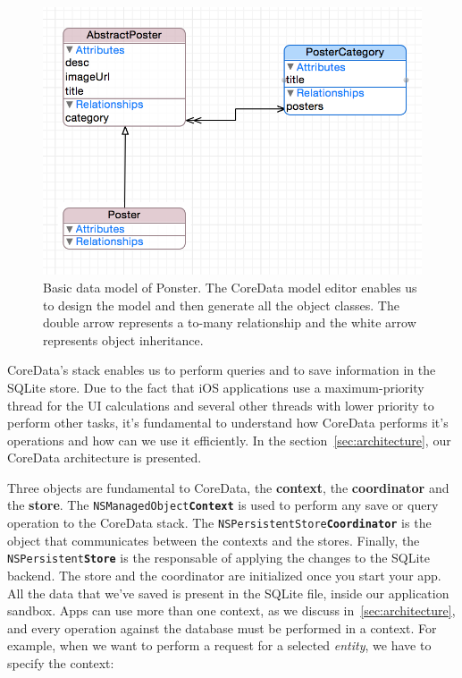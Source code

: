 \begin{figure}
\centering
\includegraphics[scale=0.65]{img/coredata.png}
\caption{\label{fig:coredata}Basic data model of Ponster. The CoreData model editor
  enables us to design the model and then generate all the object classes. The
  double arrow represents a to-many relationship and the white arrow represents
  object inheritance.}
\end{figure} 

CoreData's stack enables us to perform queries and to save information in the SQLite
store. Due to the fact that iOS applications use a maximum-priority thread for the
UI calculations and several other threads with lower priority to perform other
tasks, it's fundamental to understand how CoreData performs it's operations and how
can we use it efficiently. In the section~\ref{sec:architecture}, our CoreData
architecture is presented.

Three objects are fundamental to CoreData, the \textbf{context}, the \textbf{coordinator}
and the \textbf{store}. The \texttt{NSManagedObject\textbf{Context}} is used to perform
any save or query operation to the CoreData stack. The
\texttt{NSPersistentStore\textbf{Coordinator}} is the object that communicates
between the contexts and the stores. Finally, the
\texttt{NSPersistent\textbf{Store}} is the responsable of applying the changes to
the SQLite backend. The store and the coordinator are initialized once you start
your app. All the data that we've saved is present in the SQLite file, inside our
application sandbox. Apps can use more than one context, as we discuss
in~\ref{sec:architecture}, and every operation against the database must be
performed in a context. For example, when we want to perform a request for a
selected \textit{entity}, we have to specify the context:

